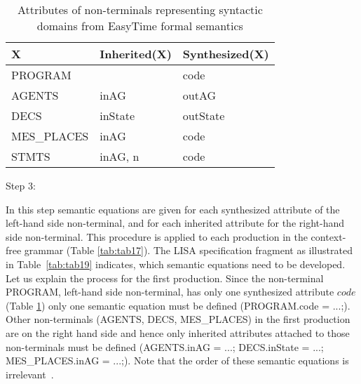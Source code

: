 \documentclass[preprint, prX]{revtex4}
\begin{document}
\begin{table}[htb]           \caption{Attributes of non-terminals representing syntactic domains from EasyTime formal semantics}
\label{tab:tab18}
\vspace{-5mm}
\footnotesize
\begin{center}
\begin{tabular}{ | l | l | l | }
\hline
X          &   Inherited(X)      &   Synthesized(X)\\
\hline
PROGRAM    &          &       code\\
AGENTS     &   inAG              &      outAG\\
DECS       &   inState           &      outState\\
MES\_PLACES &   inAG              &      code\\
STMTS      &   inAG, n           &      code\\
\hline
\end{tabular}
\end{center}
\normalsize
\vspace{-5mm}
\end{table}

Step 3:

In this step semantic equations are given for each synthesized attribute of the left-hand side non-terminal, and for each inherited attribute for the right-hand side non-terminal. This procedure is applied to each production in the context-free grammar (Table \ref{tab:tab17}). The LISA specification fragment as illustrated in Table~\ref{tab:tab19} indicates, which semantic equations need to be developed. Let us explain the process for the first production. Since the non-terminal PROGRAM, left-hand side non-terminal, has only one synthesized attribute $code$ (Table \ref{tab:tab18}) only one semantic equation must be defined (PROGRAM.code = ...;). Other non-terminals (AGENTS, DECS, MES\_PLACES) in the first production are on the right hand side and hence only inherited attributes attached to those non-terminals must be defined (AGENTS.inAG = ...; DECS.\-inState = ...; MES\_\-PLACES.\-inAG = ...;). Note that the order of these semantic equations is irrelevant~\cite{Knuth:1968,Paakki:1995}.
\end{document}
